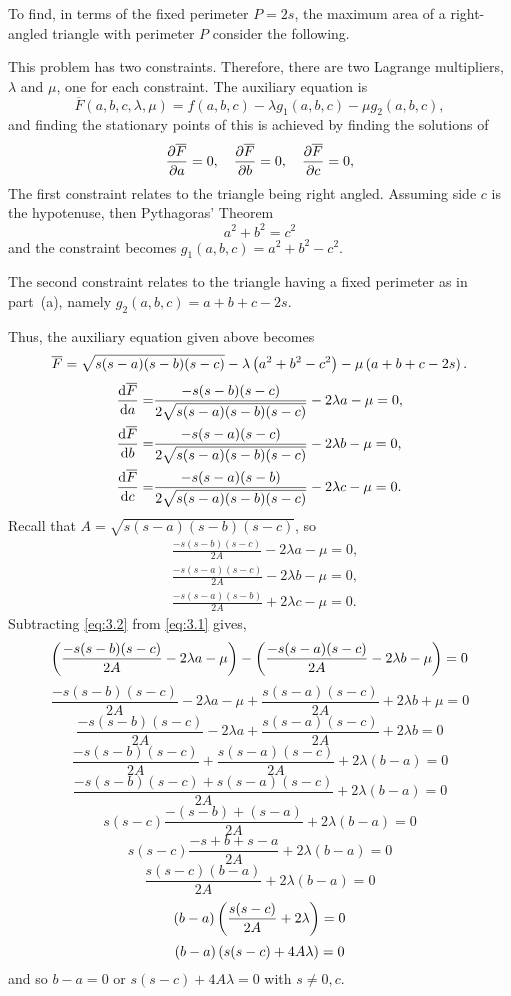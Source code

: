 To find, in terms of the fixed perimeter $P = 2s$, the maximum area of a right-angled triangle with perimeter $P$ consider the following.

This problem has two constraints. Therefore, there are two Lagrange multipliers, $\lambda$ and $\mu$, one for each constraint. The auxiliary equation is
\[
	\overline{F}(a,b,c,\lambda, \mu) = f(a,b,c) - \lambda g_1(a,b,c) - \mu g_2(a,b,c),
\]
and finding the stationary points of this is achieved by finding the solutions of
\[
	\frac{\partial \overline{F}}{\partial a} = 0,\quad
	\frac{\partial \overline{F}}{\partial b} = 0,\quad
	\frac{\partial \overline{F}}{\partial c} = 0,
\]
The first constraint relates to the triangle being right angled. Assuming side $c$ is the hypotenuse, then Pythagoras' Theorem
\[
	a^2 + b^2 = c^2
\]
and the constraint becomes $g_1(a,b,c) = a^2 + b^2 - c^2$.

The second constraint relates to the triangle having a fixed perimeter as in part~(a), namely $g_2(a,b,c) = a + b + c -2s$.

Thus, the auxiliary equation given above becomes
\[
	\overline{F} = \sqrt{s(s-a)(s-b)(s-c)} - \lambda\left(a^2 + b^2 - c^2\right) - \mu\left(a + b + c - 2s\right).
\]
\begin{align*}
	\frac{\mathrm{d}\overline{F}}{\mathrm{d}a} =&\frac{-s(s-b)(s-c)}{2\sqrt{s(s-a)(s-b)(s-c)}} - 2\lambda a - \mu=0,\\
	\frac{\mathrm{d}\overline{F}}{\mathrm{d}b} =&\frac{-s(s-a)(s-c)}{2\sqrt{s(s-a)(s-b)(s-c)}} - 2\lambda b - \mu=0,\\
	\frac{\mathrm{d}\overline{F}}{\mathrm{d}c} =&\frac{-s(s-a)(s-b)}{2\sqrt{s(s-a)(s-b)(s-c)}} - 2\lambda c - \mu=0.
\end{align*}
Recall that $A=\sqrt{s(s-a)(s-b)(s-c)}$, so
\begin{align}
	\label{eq:3.1}
	{}&\frac{-s(s-b)(s-c)}{2A} - 2\lambda a - \mu=0,\\
	\label{eq:3.2}
	{}&\frac{-s(s-a)(s-c)}{2A} - 2\lambda b - \mu=0,\\
	\label{eq:3.3}
	{}&\frac{-s(s-a)(s-b)}{2A} + 2\lambda c - \mu=0.
\end{align} 
Subtracting \eqref{eq:3.2} from \eqref{eq:3.1} gives,
\[
	\left(\frac{-s(s-b)(s-c)}{2A} - 2\lambda a - \mu\right) -\left(\frac{-s(s-a)(s-c)}{2A} - 2\lambda b - \mu\right) = 0
\]
\[
	\frac{-s(s-b)(s-c)}{2A} - 2\lambda a - \mu + \frac{s(s-a)(s-c)}{2A} + 2\lambda b + \mu =0
\]
\[
	\frac{-s(s-b)(s-c)}{2A} - 2\lambda a + \frac{s(s-a)(s-c)}{2A} + 2\lambda b=0
\]
\[
	\frac{-s(s-b)(s-c)}{2A} + \frac{s(s-a)(s-c)}{2A} + 2\lambda (b  - a)=0
\]
\[
	\frac{-s(s-b)(s-c) + s(s-a)(s-c)}{2A} + 2\lambda (b  - a)=0
\]
\[
	s(s-c)\frac{-(s-b) + (s-a)}{2A} + 2\lambda (b  - a)=0
\]
\[
	s(s-c)\frac{-s+b + s-a}{2A} + 2\lambda (b  - a)=0
\]
\[
	\frac{s(s-c)(b -a)}{2A} + 2\lambda (b  - a)=0
\]
\[
	(b -a)\left(\frac{s(s-c)}{2A} + 2\lambda\right)=0
\]
\[
	(b -a)\left(s(s-c) + 4A\lambda\right)=0
\]
and so $b-a = 0$ or $s(s-c) + 4A\lambda=0$ with $s\ne 0, c$.


